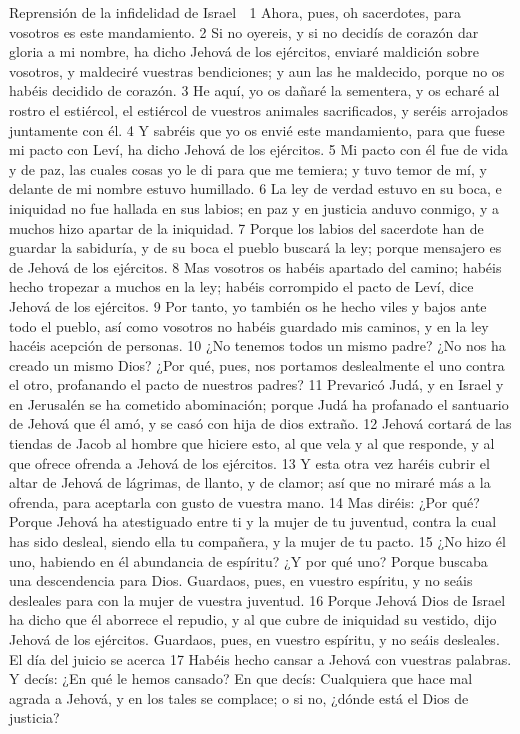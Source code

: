 Reprensión de la infidelidad de Israel

1 Ahora, pues, oh sacerdotes, para vosotros es este mandamiento.
2 Si no oyereis, y si no decidís de corazón dar gloria a mi nombre, ha dicho Jehová de los ejércitos, enviaré maldición sobre vosotros, y maldeciré vuestras bendiciones; y aun las he maldecido, porque no os habéis decidido de corazón.
3 He aquí, yo os dañaré la sementera, y os echaré al rostro el estiércol, el estiércol de vuestros animales sacrificados, y seréis arrojados juntamente con él.
4 Y sabréis que yo os envié este mandamiento, para que fuese mi pacto con Leví, ha dicho Jehová de los ejércitos.
5 Mi pacto con él fue de vida y de paz, las cuales cosas yo le di para que me temiera; y tuvo temor de mí, y delante de mi nombre estuvo humillado.
6 La ley de verdad estuvo en su boca, e iniquidad no fue hallada en sus labios; en paz y en justicia anduvo conmigo, y a muchos hizo apartar de la iniquidad.
7 Porque los labios del sacerdote han de guardar la sabiduría, y de su boca el pueblo buscará la ley; porque mensajero es de Jehová de los ejércitos.
8 Mas vosotros os habéis apartado del camino; habéis hecho tropezar a muchos en la ley; habéis corrompido el pacto de Leví, dice Jehová de los ejércitos.
9 Por tanto, yo también os he hecho viles y bajos ante todo el pueblo, así como vosotros no habéis guardado mis caminos, y en la ley hacéis acepción de personas. 
10 ¿No tenemos todos un mismo padre? ¿No nos ha creado un mismo Dios? ¿Por qué, pues, nos portamos deslealmente el uno contra el otro, profanando el pacto de nuestros padres?
11 Prevaricó Judá, y en Israel y en Jerusalén se ha cometido abominación; porque Judá ha profanado el santuario de Jehová que él amó, y se casó con hija de dios extraño.
12 Jehová cortará de las tiendas de Jacob al hombre que hiciere esto, al que vela y al que responde, y al que ofrece ofrenda a Jehová de los ejércitos.
13 Y esta otra vez haréis cubrir el altar de Jehová de lágrimas, de llanto, y de clamor; así que no miraré más a la ofrenda, para aceptarla con gusto de vuestra mano.
14 Mas diréis: ¿Por qué? Porque Jehová ha atestiguado entre ti y la mujer de tu juventud, contra la cual has sido desleal, siendo ella tu compañera, y la mujer de tu pacto.
15 ¿No hizo él uno, habiendo en él abundancia de espíritu? ¿Y por qué uno? Porque buscaba una descendencia para Dios. Guardaos, pues, en vuestro espíritu, y no seáis desleales para con la mujer de vuestra juventud.
16 Porque Jehová Dios de Israel ha dicho que él aborrece el repudio, y al que cubre de iniquidad su vestido, dijo Jehová de los ejércitos. Guardaos, pues, en vuestro espíritu, y no seáis desleales.
El día del juicio se acerca
17 Habéis hecho cansar a Jehová con vuestras palabras. Y decís: ¿En qué le hemos cansado? En que decís: Cualquiera que hace mal agrada a Jehová, y en los tales se complace; o si no, ¿dónde está el Dios de justicia?

